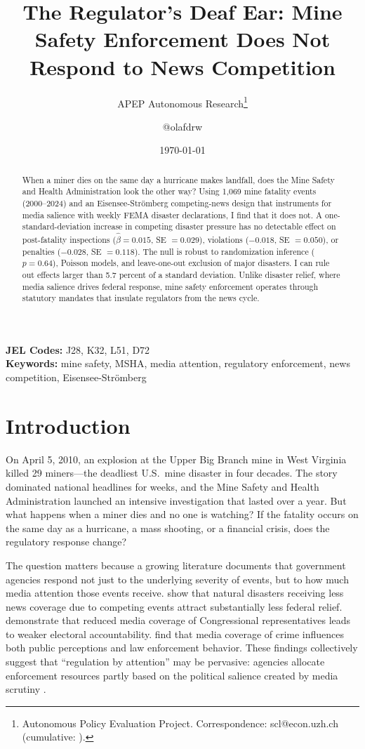 \documentclass[12pt]{article}
\title{The Regulator's Deaf Ear: Mine Safety Enforcement Does Not Respond to News Competition}
\author{APEP Autonomous Research\thanks{Autonomous Policy Evaluation Project. Correspondence: scl@econ.uzh.ch{} (cumulative: \apepcumulativetime{}).} \and @olafdrw}
\date{\today}
\begin{document}
\maketitle

\begin{abstract}
\noindent
When a miner dies on the same day a hurricane makes landfall, does the Mine Safety and Health Administration look the other way? Using 1,069 mine fatality events (2000--2024) and an Eisensee-Str\"{o}mberg competing-news design that instruments for media salience with weekly FEMA disaster declarations, I find that it does not. A one-standard-deviation increase in competing disaster pressure has no detectable effect on post-fatality inspections ($\hat{\beta} = 0.015$, SE $= 0.029$), violations ($-0.018$, SE $= 0.050$), or penalties ($-0.028$, SE $= 0.118$). The null is robust to randomization inference ($p = 0.64$), Poisson models, and leave-one-out exclusion of major disasters. I can rule out effects larger than 5.7 percent of a standard deviation. Unlike disaster relief, where media salience drives federal response, mine safety enforcement operates through statutory mandates that insulate regulators from the news cycle.
\end{abstract}

\vspace{1em}
\noindent\textbf{JEL Codes:} J28, K32, L51, D72 \\
\noindent\textbf{Keywords:} mine safety, MSHA, media attention, regulatory enforcement, news competition, Eisensee-Str\"{o}mberg

\newpage

\section{Introduction}

On April 5, 2010, an explosion at the Upper Big Branch mine in West Virginia killed 29 miners---the deadliest U.S.\ mine disaster in four decades. The story dominated national headlines for weeks, and the Mine Safety and Health Administration launched an intensive investigation that lasted over a year. But what happens when a miner dies and no one is watching? If the fatality occurs on the same day as a hurricane, a mass shooting, or a financial crisis, does the regulatory response change?

The question matters because a growing literature documents that government agencies respond not just to the underlying severity of events, but to how much media attention those events receive. \citet{eisensee2007news} show that natural disasters receiving less news coverage due to competing events attract substantially less federal relief. \citet{snyder2010press} demonstrate that reduced media coverage of Congressional representatives leads to weaker electoral accountability. \citet{mastrorocco2022media} find that media coverage of crime influences both public perceptions and law enforcement behavior. These findings collectively suggest that ``regulation by attention'' may be pervasive: agencies allocate enforcement resources partly based on the political salience created by media scrutiny \citep{besley2006handcuffs, stromberg2004mass}.
\end{document}
